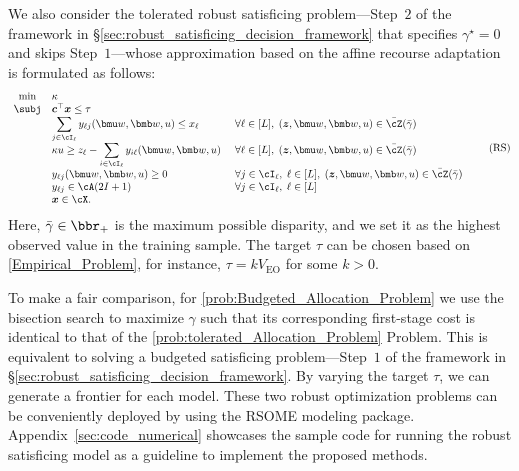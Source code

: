 \documentclass[mnsc, nonblindrev]{informswp}
\newcommand{\1}[1]{\mathds{1}{\left(#1\right)}}
\begin{document}
We also consider the tolerated robust satisficing problem---Step~$2$ of the framework in \S \ref{sec:robust_satisficing_decision_framework} that specifies $\gamma^\star = 0$ and skips Step~$1$---whose approximation based on the affine recourse adaptation is formulated as follows:
\begin{equation} \label{prob:tolerated_Allocation_Problem}
\begin{array}{cll}
     \min & \kappa \\
     \subj & \bm c^\top \bm x \leq \tau \\
     & \displaystyle \sum_{j \in \cI_\ell} y_{\ell j}({\bmu w}, {\bmb w},u) \leq x_\ell \quad & ~\forall \ell \in [L],\; ({\bm z}, {\bmu w}, {\bmb w},u) \in \bar{\cZ} (\bar{\gamma}) \\
     & \displaystyle \kappa u \geq z_\ell - \sum_{i \in \cI_\ell} y_{i \ell}({\bmu w}, {\bmb w},u)  &~ \forall \ell \in [L],\; ({\bm z}, {\bmu w}, {\bmb w},u) \in \bar{\cZ} (\bar{\gamma}) \\
     & \displaystyle y_{\ell j}(\bmu w, \bmb w, u) \geq 0 &~ \forall  j \in \cI_\ell,\; \ell \in [L],\; (\bm z, \bmu w, \bmb w, u) \in \bar \cZ(\bar{\gamma}) \\
     & \displaystyle y_{\ell j} \in \cA(2I+1) &~ \forall j \in \cI_\ell,\; \ell \in [L] \\
     & \displaystyle {\bm x} \in \cX.
\end{array}
\tag{RS}
\end{equation}
Here, $\bar \gamma \in \bbr_+$ is the maximum possible disparity, and we set it as the highest observed value in the training sample. The target $\tau$ can be chosen based on \ref{Empirical_Problem}, for instance, $\tau = k V_{\mathrm{EO}}$ for some $k > 0$. 

To make a fair comparison, for \ref{prob:Budgeted_Allocation_Problem} we use the bisection search to maximize $\gamma$ such that its corresponding first-stage cost is identical to that of the \ref{prob:tolerated_Allocation_Problem} Problem. This is equivalent to solving a budgeted satisficing problem---Step~$1$ of the framework in \S \ref{sec:robust_satisficing_decision_framework}. By varying the target $\tau$, we can generate a frontier for each model. These two robust optimization problems can be conveniently deployed by using the RSOME modeling package. Appendix~\ref{sec:code_numerical} showcases the sample code for running the robust satisficing model as a guideline to implement the proposed methods.
\end{document}
